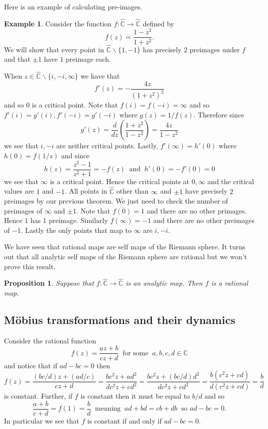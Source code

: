 \documentclass[12pt]{article}
\newtheorem{proposition}[theorem]{Proposition}
\theoremstyle{definition}
\newtheorem{example}[theorem]{Example}
\theoremstyle{remark}
\begin{document}
Here is an example of calculating pre-images.
\begin{example}
Consider the function $f :\widehat{\mathbb{C}} \to \widehat{\mathbb{C}}$ defined by
\[
f(z) = \frac{1-z^2}{1+z^2}.
\]
We will show that every point in $\widehat{\mathbb{C}} \backslash \{ 1, -1\}$ has precisely $2$ preimages under $f$ and that $\pm1$ have $1$ preimage each.

When $z \in \widehat{\mathbb{C}}\backslash\{i,-i, \infty\}$ we have that 
\[
f'(z) = - \frac{4z}{(1+z^2)^2}
\]
and so $0$ is a critical point. Note that $f(i) = f(-i) = \infty$ and so $f'(i) = g'(i), f'(-i) = g'(-i)$ where $g(z) = 1/f(z)$. Therefore since
\[
g'(z) = \frac{d}{dz} \left( \frac{1+z^2}{1-z^2}\right) = \frac{4z}{1-z^2}
\]
we see that $i, -i$ are neither critical points. Lastly, $f'(\infty) = h'(0)$ where $h(0) = f(1/z)$ and since
\[
h(z) = \frac{z^2 - 1}{z^2 + 1} = -f(z) \ \text{ and } \ h'(0) = -f'(0) = 0
\]
we see that $\infty$ is a critical point. Hence the critical points at $0, \infty$ and the  critical values are $1$ and $-1$.
All points in $\widehat{\mathbb{C}}$ other than $\infty$ and $\pm 1$ have precisely $2$ preimages by our previous theorem. We just need to check the number of preimages of $\infty$ and $\pm 1$. Note that $f(0) = 1$ and there are no other primages. Hence $1$ has 1 preimage. Similarly $f(\infty) = -1$ and there are no other preimages of $-1$.  Lastly the only points that map to $\infty$ are $i, -i$. 
\end{example}

We have seen that rational maps are self maps of the Riemann sphere. It turns out that all analytic self maps of the Riemann sphere are rational but we won't prove this result.

\begin{proposition}
Suppose that $f:\widehat{\mathbb{C}} \to \widehat{\mathbb{C}}$ is an analytic map. Then $f$ is a rational map.
\end{proposition}

\subsection{M\"obius transformations and their dynamics}
Consider the rational function
\[
f(z) = \frac{az + b}{cz + d} \ \text{ for some } \ a,b,c,d \in \mathbb{C}
\]
and notice that if $ad - bc = 0$ then
\[
f(z) = \frac{(bc/d)z + (ad/c)}{cz + d} = \frac{bc^2 z + ad^2}{dc^2z + cd^2} = \frac{bc^2 z + (bc/d)d^2}{dc^2 z + cd^2} = \frac{b(c^2z + cd)}{d(c^2 z+ cd)} = \frac{b}{d}
\]
is constant. Further, if $f$ is constant then it must be equal to $b/d$ and so
\[
\frac{a+b}{c+d} = f(1) = \frac{b}{d} \ \text{ meaning } \ ad + bd = cb + db \ \text{ so } ad - bc = 0.
\]
 In particular we see that $f$ is constant if and only if $ad - bc = 0$.
\end{document}

